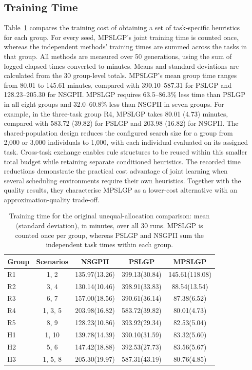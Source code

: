 \documentclass[10pt,journal]{IEEEtran}
\begin{document}



\subsection{Training Time}
Table~\ref{tab:latest-training-time} compares the training cost of obtaining a set of task-specific heuristics for each group. For every seed, MPSLGP's joint training time is counted once, whereas the independent methods' training times are summed across the tasks in that group. All methods are measured over 50 generations, using the sum of logged elapsed times converted to minutes. Means and standard deviations are calculated from the 30 group-level totals. MPSLGP's mean group time ranges from 80.01 to 145.61 minutes, compared with 390.10--587.31 for PSLGP and 128.23--205.30 for NSGPII. MPSLGP requires 63.5--86.3\% less time than PSLGP in all eight groups and 32.0--60.8\% less than NSGPII in seven groups. For example, in the three-task group R4, MPSLGP takes 80.01 (4.73) minutes, compared with 583.72 (39.82) for PSLGP and 203.98 (16.82) for NSGPII. The shared-population design reduces the configured search size for a group from 2,000 or 3,000 individuals to 1,000, with each individual evaluated on its assigned task. Cross-task exchange enables rule structures to be reused within this smaller total budget while retaining separate conditioned heuristics. The recorded time reductions demonstrate the practical cost advantage of joint learning when several scheduling environments require their own heuristics. Together with the quality results, they characterise MPSLGP as a lower-cost alternative with an approximation-quality trade-off.

\begin{table}[t]
\centering
\caption{Training time for the original unequal-allocation comparison: mean (standard deviation), in minutes, over all 30 runs. MPSLGP is counted once per group, whereas PSLGP and NSGPII sum the independent task times within each group.}
\label{tab:latest-training-time}
\footnotesize
\setlength{\tabcolsep}{3pt}
\newcommand{\TrainingTimeRows}{%
R1 & 1, 2 & 135.97(13.26) & 399.13(30.84) & 145.61(118.08) \\
R2 & 3, 4 & 130.14(10.46) & 398.91(33.83) & 88.54(13.54) \\
R3 & 6, 7 & 157.00(18.56) & 390.61(36.14) & 87.38(6.52) \\
R4 & 1, 3, 5 & 203.98(16.82) & 583.72(39.82) & 80.01(4.73) \\
R5 & 8, 9 & 128.23(10.86) & 393.92(29.34) & 82.53(5.04) \\
H1 & 1, 10 & 139.78(14.39) & 390.10(31.59) & 83.32(5.60) \\
H2 & 5, 6 & 147.42(18.88) & 392.53(27.73) & 83.56(5.67) \\
H3 & 1, 5, 8 & 205.30(19.97) & 587.31(43.19) & 80.76(4.85) \\
}
\begin{tabular}{@{}lc*{3}{c}@{}}
\toprule
Group & Scenarios & NSGPII & PSLGP & MPSLGP \\
\midrule
\TrainingTimeRows
\bottomrule
\end{tabular}
\end{table}
\end{document}
